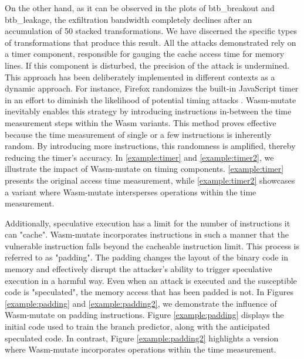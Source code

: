 \documentclass[sigplan,screen]{acmart}
\newcommand*\badge[1]{ \colorbox{red}{\color{white}#1}}
\newcommand{\tool}{Wasm-mutate\xspace}
\newcommand{\wasm}{Wasm\xspace}
\newcommand{\todo}[1]{%
\refstepcounter{todo}
\noindent\textbf{\badge{TODO}} {\color{red}#1}
\addcontentsline{td}{todo}
{\color{red}\thesection.\thetodo\xspace #1}}
\begin{document}
On the other hand, as it can be observed in the plots of btb\_breakout and btb\_leakage, the exfiltration bandwidth completely declines after an accumulation of 50 stacked transformations. 
We have discerned the specific types of transformations that produce this result.
All the attacks demonstrated rely on a timer component, responsible for gauging the cache access time for memory lines. 
If this component is disturbed, the precision of the attack is undermined. 
This approach has been deliberately implemented in different contexts as a dynamic approach. 
For instance, Firefox randomizes the built-in JavaScript timer in an effort to diminish the likelihood of potential timing attacks \cite{10.1007/978-3-319-70972-7_13}.
\tool inevitably enables this strategy by introducing instructions in-between the time measurement steps within the \wasm variants.
This method proves effective because the time measurement of single or a few instructions is inherently random. 
By introducing more instructions, this randomness is amplified, thereby reducing the timer's accuracy.
In \autoref{example:timer} and \autoref{example:timer2}, we illustrate the impact of \tool on timing components. \autoref{example:timer} presents the original access time measurement, while \autoref{example:timer2} showcases a variant where \tool intersperses operations within the time measurement.



Additionally, speculative execution has a limit for the number of instructions it can "cache". 
\tool incorporates instructions in such a manner that the vulnerable instruction falls beyond the cacheable instruction limit. 
This process is referred to as "padding".
The padding changes the layout of the binary code in memory and effectively disrupt the attacker's ability to trigger speculative execution in a harmful way.
Even when an attack is executed and the susceptible code is "speculated", the memory access that has been padded is not.
In Figures \autoref{example:padding} and \autoref{example:padding2}, we demonstrate the influence of \tool on padding instructions. Figure \autoref{example:padding} displays the initial code used to train the branch predictor, along with the anticipated speculated code. In contrast, Figure \autoref{example:padding2} highlights a version where \tool incorporates operations within the time measurement.
\end{document}
